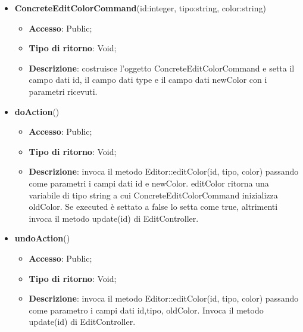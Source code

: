 {{{	
	\begin{itemize}
		\item \textbf{ConcreteEditColorCommand}(id:integer, tipo:string, color:string)
		\begin{itemize}
			\item \textbf{Accesso}: Public;
			\item \textbf{Tipo di ritorno}: Void;
			\item \textbf{Descrizione}: costruisce l’oggetto ConcreteEditColorCommand e setta il campo dati id, il campo dati type e il campo dati newColor con i parametri ricevuti.
		\end{itemize}
		\item \textbf{doAction}()
		\begin{itemize}
			\item \textbf{Accesso}: Public;
			\item \textbf{Tipo di ritorno}: Void;
			\item \textbf{Descrizione}: invoca il metodo Editor::editColor(id, tipo, color) passando come parametri i campi dati id e newColor. editColor ritorna una variabile di tipo string a cui ConcreteEditColorCommand inizializza oldColor. Se executed è settato a false lo setta come true, altrimenti invoca il metodo update(id) di EditController.
		\end{itemize}
		\item \textbf{undoAction}()
		\begin{itemize}
			\item \textbf{Accesso}: Public;
			\item \textbf{Tipo di ritorno}: Void;
			\item \textbf{Descrizione}: invoca il metodo Editor::editColor(id, tipo, color) passando come parametro i campi dati id,tipo, oldColor. Invoca il metodo update(id) di EditController.
		\end{itemize}
	\end{itemize}
	}
}}
